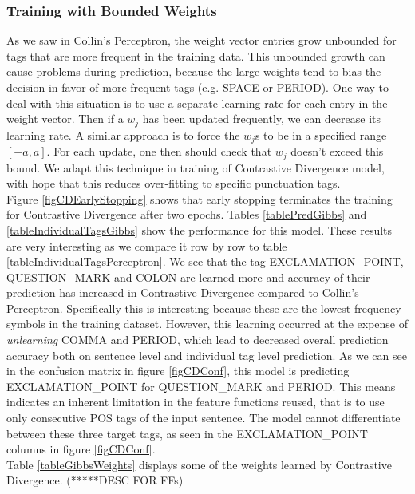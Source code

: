 \documentclass[twoside,12pt]{article}
\begin{document}
\subsubsection{Training with Bounded Weights}
As we saw in Collin's Perceptron, the weight vector entries grow unbounded for tags that are more frequent in the training data. This unbounded growth can cause problems during prediction, because the large weights tend to bias the decision in favor of more frequent tags (e.g. SPACE or PERIOD). One way to deal with this situation is to use a separate learning rate for each entry in the weight vector. Then if a $w_j$ has been updated frequently, we can decrease its learning rate. A  similar approach is to force the $w_j$s to be in a specified range $[-a,a]$. For each update, one then should check that $w_j$ doesn't exceed this bound. We adapt this technique in training of Contrastive Divergence model, with hope that this reduces over-fitting to specific punctuation tags.\\
Figure \ref{figCDEarlyStopping} shows that early stopping terminates the training for Contrastive Divergence after two epochs. Tables \ref{tablePredGibbs} and \ref{tableIndividualTagsGibbs} show the performance for this model. These results are very interesting as we compare it row by row to table \ref{tableIndividualTagsPerceptron}. We see that the tag EXCLAMATION\_POINT, QUESTION\_MARK and COLON are learned more and accuracy of their prediction has  increased in Contrastive Divergence compared to Collin's Perceptron. Specifically this is interesting because these are the lowest frequency symbols in the training dataset. However, this learning occurred at the expense of \emph{unlearning} COMMA and PERIOD, which lead to decreased overall prediction accuracy both on sentence level and individual tag level prediction.  As we can see in the confusion matrix in figure \ref{figCDConf}, this model is predicting EXCLAMATION\_POINT for QUESTION\_MARK and PERIOD. This means indicates an inherent limitation in the feature functions reused, that is to use only consecutive POS tags of the input sentence. The model cannot differentiate between these three target tags, as seen in the EXCLAMATION\_POINT columns in figure \ref{figCDConf}. \\

Table \ref{tableGibbsWeights} displays some of the weights learned by Contrastive Divergence. (*****DESC FOR FFs)
\end{document}
